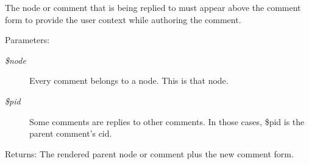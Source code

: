 The node or comment that is being replied to must appear above the comment form to provide the user context while authoring the comment.

\begin{Desc}
\item[Parameters:]
\begin{description}
\item[{\em \$node}]Every comment belongs to a node. This is that node.\item[{\em \$pid}]Some comments are replies to other comments. In those cases, \$pid is the parent comment's cid.\end{description}
\end{Desc}
\begin{Desc}
\item[Returns:]The rendered parent node or comment plus the new comment form. \end{Desc}
